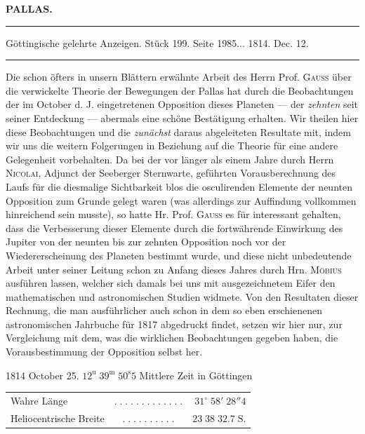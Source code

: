 \clearpage{}\hypertarget{native-384-lower}{}\label{native-384-lower}
\begin{center}\textbf{PALLAS.}\par\vspace{4pt}\hrule\vspace{4pt}\fontsize{10}{12}\selectfont Göttingische gelehrte Anzeigen. Stück 199. Seite 1985\;... 1814. Dec. 12.\par\vspace{4pt}\hrule\vspace{4pt}\end{center}

\par\indent Die schon öfters in unsern Blättern erwähnte Arbeit des Herrn Prof. \textsc{Gauss} über die
verwickelte Theorie der Bewegungen der Pallas hat durch die Beobachtungen der im October d. J.
eingetretenen Opposition dieses Planeten — der \emph{zehnten} seit seiner Entdeckung — abermals
eine schöne Bestätigung erhalten. Wir theilen hier diese Beobachtungen und die \emph{zunächst}
daraus abgeleiteten Resultate mit, indem wir uns die weitern Folgerungen in Beziehung auf die
Theorie für eine andere Gelegenheit vorbehalten. Da bei der vor länger als einem Jahre durch
Herrn \textsc{Nicolai}, Adjunct der Seeberger Sternwarte, geführten Vorausberechnung des Laufs
für die diesmalige Sichtbarkeit blos die osculirenden Elemente der neunten Opposition zum
Grunde gelegt waren (was allerdings zur Auffindung vollkommen hinreichend sein musste), so
hatte Hr. Prof. \textsc{Gauss} es für interessant gehalten, dass die Verbesserung dieser
Elemente durch die fortwährende Einwirkung des Jupiter von der neunten bis zur zehnten
Opposition noch vor der Wiedererscheinung des Planeten bestimmt wurde, und diese nicht
unbedeutende Arbeit unter seiner Leitung schon zu Anfang dieses Jahres durch Hrn.
\textsc{Möbius} ausführen lassen, welcher sich damals bei uns mit ausgezeichnetem Eifer den
mathematischen und astronomischen Studien widmete. Von den Resultaten dieser Rechnung, die man
ausführlicher auch schon in dem so eben erschienenen astronomischen Jahrbuche für 1817
abgedruckt findet, setzen wir hier nur, zur Vergleichung mit dem, was die wirklichen
Beobachtungen gegeben haben, die Vorausbestimmung der Opposition selbst her.

\begin{center}1814 October 25. $12^{\mathrm u}\;39^{\mathrm m}\;50^{\mathrm s}5$ Mittlere Zeit in Göttingen\end{center}
\begin{center}\fontsize{10}{12}\selectfont\setlength{\tabcolsep}{3pt}\renewcommand{\arraystretch}{1.15}\begin{tabular}{lcr}
Wahre Länge & $.\;.\;.\;.\;.\;.\;.\;.\;.\;.\;.\;.\;.$ & $31^\circ\;58'\;28''4$\\
Heliocentrische Breite & $.\;.\;.\;.\;.\;.\;.\;.\;.\;.$ & $23\;38\;32.7\;\mathrm{S.}$\\
\end{tabular}\end{center}


